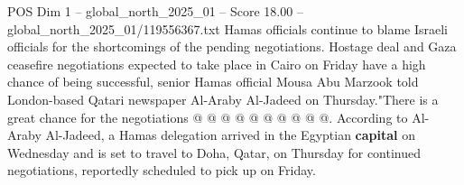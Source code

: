 \begin{textsample}{POS Dim 1 – global\_north\_2025\_01 – Score 18.00 – global\_north\_2025\_01/119556367.txt}
Hamas officials continue to blame Israeli officials for the shortcomings of the pending negotiations.
Hostage deal and Gaza ceasefire negotiations expected to take place in Cairo on Friday have a high chance of being successful, senior Hamas official Mousa Abu Marzook told London-based Qatari newspaper Al-Araby Al-Jadeed on Thursday."There is a great chance for the negotiations @ @ @ @ @ @ @ @ @ @.
According to Al-Araby Al-Jadeed, a Hamas delegation arrived in the Egyptian \textbf{capital} on Wednesday and is set to travel to Doha, Qatar, on Thursday for continued negotiations, reportedly scheduled to pick up on Friday.

\end{textsample}
